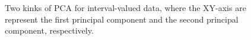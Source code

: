 \documentclass[article]{jss}
\begin{document}
\begin{figure}[htbp]
    \centering
    \caption{\label{fig:PCA} Two kinks of PCA for interval-valued data, where the XY-axis are represent the first principal component and the second principal component, respectively.}
\end{figure}
\end{document}
